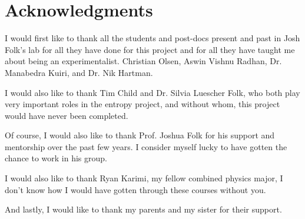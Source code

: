 
\chapter{Acknowledgments}

I would first like to thank all the students and post-docs present and past in Josh Folk's lab for all they have done for this project and for all they have taught me about being an experimentalist. Christian Olsen, Aswin Vishnu Radhan, Dr. Manabedra Kuiri, and Dr. Nik Hartman. 

I would also like to thank Tim Child and Dr. Silvia Luescher Folk, who both play very important roles in the entropy project, and without whom, this project would have never been completed. 

Of course, I would also like to thank Prof. Joshua Folk for his support and mentorship over the past few years. I consider myself lucky to have gotten the chance to work in his group.

I would also like to thank Ryan Karimi, my fellow combined physics major, I don't know how I would have gotten through these courses without you. 

And lastly, I would like to thank my parents and my sister for their support.